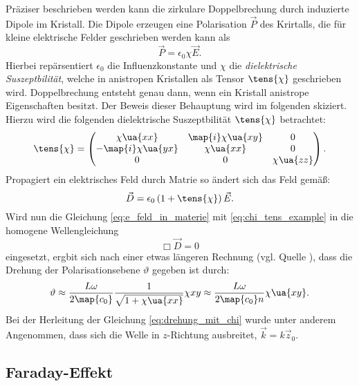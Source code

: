 Präziser beschrieben werden kann die zirkulare Doppelbrechung durch induzierte
Dipole im Kristall. Die Dipole erzeugen eine Polarisation $\vec{P}$ des Krirtalls,
die für kleine elektrische Felder geschrieben werden kann als
\begin{equation*}
\vec{P}=\epsilon_0\chi\vec{E}.
\end{equation*}
Hierbei repärsentiert $\epsilon_0$ die Influenzkonstante und $\chi$ die
\emph{dielektrische Suszeptbilität}, welche in anistropen Kristallen als
Tensor $\tens{\chi}$ geschrieben wird. Doppelbrechung entsteht genau dann, wenn
ein Kristall anistrope Eigenschaften besitzt. Der Beweis dieser Behauptung wird
im folgenden skiziert. Hierzu wird die folgenden dielektrische Suszeptbilität
 $\tens{\chi}$ betrachtet:
\begin{equation}
  \label{eq:chi_tens_example}
  \tens{\chi}=\begin{pmatrix} \chi\ua{xx} & \map{i}\chi\ua{xy} & 0 \\ -\map{i}\chi\ua{yx} & \chi\ua{xx} & 0 \\ 0 & 0 & \chi\ua{zz} \end{pmatrix}.
\end{equation}
Propagiert ein elektrisches Feld durch Matrie so ändert sich das Feld gemäß:
\begin{equation}
  \label{eq:e_feld_in_materie}
  \vec{D}=\epsilon_0\left(1+\tens{\chi}\right)\vec{E}.
\end{equation}
Wird nun die Gleichung \eqref{eq:e_feld_in_materie} mit \eqref{eq:chi_tens_example}
in die homogene Wellengleichung
\begin{equation*}
  \Box \vec{D} = 0
\end{equation*}
eingesetzt, ergbit sich nach einer etwas längeren Rechnung (vgl. Quelle \cite{anleitungv46}),
dass die Drehung der Polarisationsebene $\vartheta$ gegeben ist durch:
\begin{equation}
  \label{eq:drehung_mit_chi}
  \vartheta \approx \frac{L\omega}{2\map{c_0}}\frac{1}{\sqrt{1+\chi\ua{xx}}}\chi{xy}\approx\frac{L\omega}{2\map{c_0}n}\chi\ua{xy}.
\end{equation}
Bei der Herleitung der Gleichung \eqref{eq:drehung_mit_chi} wurde unter anderem Angenommen,
dass sich die Welle in $z$-Richtung ausbreitet, $\vec{k}=k\vec{z}_0$.
\subsection{Faraday-Effekt}
